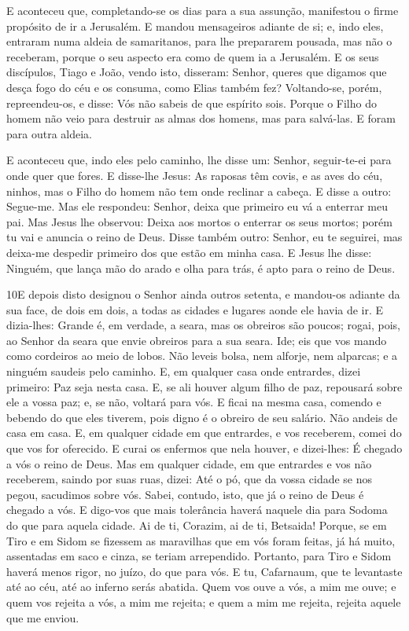 E aconteceu que, completando-se os dias para a sua assunção,
manifestou o firme propósito de ir a Jerusalém. E mandou
mensageiros adiante de si; e, indo eles, entraram numa aldeia de
samaritanos, para lhe prepararem pousada, mas não o
receberam, porque o seu aspecto era como de quem ia a Jerusalém.
E os seus discípulos, Tiago e João, vendo isto, disseram:
Senhor, queres que digamos que desça fogo do céu e os consuma, como
Elias também fez? Voltando-se, porém, repreendeu-os, e disse:
Vós não sabeis de que espírito sois. Porque o Filho do homem
não veio para destruir as almas dos homens, mas para salvá-las. E
foram para outra aldeia.

E aconteceu que, indo eles pelo caminho, lhe disse um: Senhor,
seguir-te-ei para onde quer que fores. E disse-lhe Jesus: As
raposas têm covis, e as aves do céu, ninhos, mas o Filho do homem
não tem onde reclinar a cabeça. E disse a outro: Segue-me.
Mas ele respondeu: Senhor, deixa que primeiro eu vá a enterrar meu
pai. Mas Jesus lhe observou: Deixa aos mortos o enterrar os
seus mortos; porém tu vai e anuncia o reino de Deus. Disse
também outro: Senhor, eu te seguirei, mas deixa-me despedir primeiro
dos que estão em minha casa. E Jesus lhe disse: Ninguém, que
lança mão do arado e olha para trás, é apto para o reino de Deus.

\medskip

\lettrine{10} E depois disto designou o Senhor ainda outros
setenta, e mandou-os adiante da sua face, de dois em dois, a todas
as cidades e lugares aonde ele havia de ir. E dizia-lhes: Grande
é, em verdade, a seara, mas os obreiros são poucos; rogai, pois, ao
Senhor da seara que envie obreiros para a sua seara. Ide; eis
que vos mando como cordeiros ao meio de lobos. Não leveis bolsa,
nem alforje, nem alparcas; e a ninguém saudeis pelo caminho. E,
em qualquer casa onde entrardes, dizei primeiro: Paz seja nesta
casa. E, se ali houver algum filho de paz, repousará sobre ele a
vossa paz; e, se não, voltará para vós. E ficai na mesma casa,
comendo e bebendo do que eles tiverem, pois digno é o obreiro de seu
salário. Não andeis de casa em casa. E, em qualquer cidade em
que entrardes, e vos receberem, comei do que vos for oferecido.
E curai os enfermos que nela houver, e dizei-lhes: É chegado a
vós o reino de Deus. Mas em qualquer cidade, em que entrardes
e vos não receberem, saindo por suas ruas, dizei: Até o pó,
que da vossa cidade se nos pegou, sacudimos sobre vós. Sabei,
contudo, isto, que já o reino de Deus é chegado a vós. E
digo-vos que mais tolerância haverá naquele dia para Sodoma do que
para aquela cidade. Ai de ti, Corazim, ai de ti, Betsaida!
Porque, se em Tiro e em Sidom se fizessem as maravilhas que em vós
foram feitas, já há muito, assentadas em saco e cinza, se teriam
arrependido. Portanto, para Tiro e Sidom haverá menos rigor,
no juízo, do que para vós. E tu, Cafarnaum, que te levantaste
até ao céu, até ao inferno serás abatida. Quem vos ouve a
vós, a mim me ouve; e quem vos rejeita a vós, a mim me rejeita; e
quem a mim me rejeita, rejeita aquele que me enviou.

